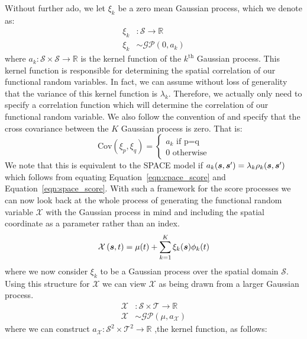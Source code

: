 Without further ado, we let $\xi_k$ be a zero mean Gaussian process, which we denote as:
\begin{align}
	\xi_k&: \mathcal{S} \to \mathbb{R} \\
	\xi_k &\sim \mathcal{GP}\left(0, a_k \right)
\end{align}
where $a_k: \mathcal{S} \times \mathcal{S} \to \mathbb{R} $ is the kernel function of the $k^\text{th}$ Gaussian process. 
This kernel function is responsible for determining the spatial correlation of our functional random variables. 
In fact, we can assume without loss of generality that the variance of this kernel function is $\lambda_k$.
Therefore, we  actually only need to specify a correlation function which will determine the correlation of our functional random variable. 
We also follow the convention of \citep{liu_functional_2017} and specify that the cross covariance between the $K$ Gaussian process is zero.
That is:
\begin{equation}
	\text{Cov}\left(\xi_p, \xi_q\right) = \begin{cases}
		a_k \text{ if p=q} \\
		0 \text{ otherwise}
	\end{cases}
	\label{eqn:cpace_score}
\end{equation}
We note that this is equivalent to the SPACE model  if $a_k(\bm{{s}}, \bm{{s}}^{\prime})  = \lambda_k \rho_k(\bm{{s}}, \bm{{s}}^{\prime})$ which follows from equating Equation~\eqref{eqn:cpace_score} and Equation~\eqref{eqn:space_score}.
With such a framework for the score processes we can now look back at the whole process of generating the functional random variable $\mathcal{X}$ with the Gaussian process in mind and including the spatial coordinate as a parameter rather than an index.
\begin{equation}
	\mathcal{X}\left(\bm{{s}}, t \right) = \mu(t) + \sum_{k=1}^K \xi_k(\bm{{s}}) \phi_k(t)
	\label{eqn:fpca_cpace}
\end{equation}
where we now consider $\xi_k$ to be a Gaussian process over the spatial domain $\mathcal{S}$.
Using this structure for $\mathcal{X}$ we can view $\mathcal{X}$ as being drawn from a larger Gaussian process. 
\begin{align}
	\mathcal{X}&: \mathcal{S} \times \mathcal{T} \to \mathbb{R}\\
	\mathcal{X} &\sim \mathcal{GP}\left(\mu, a_\mathcal{X}\right)
\end{align}
where we can construct $a_\mathcal{X}: \mathcal{S}^2 \times \mathcal{T}^2 \to \mathbb{R}$ ,the kernel function, as follows: 
